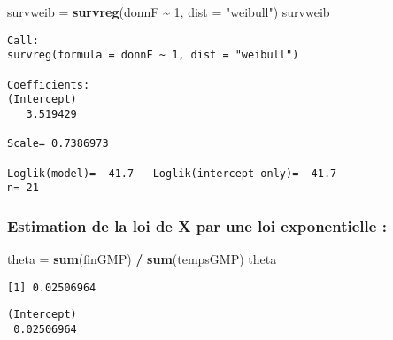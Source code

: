 \documentclass[
]{article}
\newenvironment{Shaded}{\begin{snugshade}}{\end{snugshade}}
\newcommand{\AttributeTok}[1]{\textcolor[rgb]{0.13,0.29,0.53}{#1}}
\newcommand{\DecValTok}[1]{\textcolor[rgb]{0.00,0.00,0.81}{#1}}
\newcommand{\FunctionTok}[1]{\textcolor[rgb]{0.13,0.29,0.53}{\textbf{#1}}}
\newcommand{\NormalTok}[1]{#1}
\newcommand{\OtherTok}[1]{\textcolor[rgb]{0.56,0.35,0.01}{#1}}
\newcommand{\SpecialCharTok}[1]{\textcolor[rgb]{0.81,0.36,0.00}{\textbf{#1}}}
\newcommand{\StringTok}[1]{\textcolor[rgb]{0.31,0.60,0.02}{#1}}
\begin{document}
\begin{Shaded}
\begin{Highlighting}[]
\NormalTok{survweib }\OtherTok{=} \FunctionTok{survreg}\NormalTok{(donnF }\SpecialCharTok{\textasciitilde{}} \DecValTok{1}\NormalTok{, }\AttributeTok{dist =} \StringTok{"weibull"}\NormalTok{)}
\NormalTok{survweib}
\end{Highlighting}
\end{Shaded}

\begin{verbatim}
Call:
survreg(formula = donnF ~ 1, dist = "weibull")

Coefficients:
(Intercept) 
   3.519429 

Scale= 0.7386973 

Loglik(model)= -41.7   Loglik(intercept only)= -41.7
n= 21 
\end{verbatim}

\hypertarget{estimation-de-la-loi-de-x-par-une-loi-exponentielle}{%
\subsubsection{Estimation de la loi de X par une loi exponentielle
:}\label{estimation-de-la-loi-de-x-par-une-loi-exponentielle}}

\begin{Shaded}
\begin{Highlighting}[]
\NormalTok{theta }\OtherTok{=} \FunctionTok{sum}\NormalTok{(finGMP) }\SpecialCharTok{/} \FunctionTok{sum}\NormalTok{(tempsGMP)}
\NormalTok{theta }
\end{Highlighting}
\end{Shaded}

\begin{verbatim}
[1] 0.02506964
\end{verbatim}

\begin{Shaded}
\end{Shaded}

\begin{verbatim}
(Intercept) 
 0.02506964 
\end{verbatim}
\end{document}
